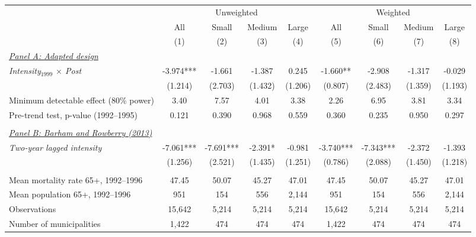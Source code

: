\begin{tabular}{lcccccccc} \hline \hline
 & \multicolumn{4}{c}{Unweighted} & \multicolumn{4}{c}{Weighted} \\ \cmidrule(lr){2-5} \cmidrule(lr){6-9}
 & All & Small & Medium & Large & All & Small & Medium & Large \\ 
 & (1) & (2) & (3) & (4) & (5) & (6) & (7) & (8) \\ \toprule
\underline{\textit{Panel A: Adapted design}} \\ 
\textit{Intensity$_{1999}$ $\times$ Post} & -3.974*** & -1.661 & -1.387 & 0.245 & -1.660** & -2.908 & -1.317 & -0.029 \\ 
 & (1.214) & (2.703) & (1.432) & (1.206) & (0.807) & (2.483) & (1.359) & (1.193) \\ 
Minimum detectable effect (80\% power) & 3.40 & 7.57 & 4.01 & 3.38 & 2.26 & 6.95 & 3.81 & 3.34 \\ 
Pre-trend test, p-value (1992--1995) & 0.121 & 0.390 & 0.968 & 0.559 & 0.360 & 0.235 & 0.950 & 0.297 \\ 
  & & & & & & & & \\ 
\underline{\textit{Panel B: Barham and Rowberry (2013)}} \\ 
\textit{Two-year lagged intensity} & -7.061*** & -7.691*** & -2.391* & -0.981 & -3.740*** & -7.343*** & -2.372 & -1.393 \\ 
 & (1.256) & (2.521) & (1.435) & (1.251) & (0.786) & (2.088) & (1.450) & (1.218) \\ 
  & & & & & & & & \\ 
Mean mortality rate 65+, 1992--1996 & 47.45 & 50.07 & 45.27 & 47.01 & 47.45 & 50.07 & 45.27 & 47.01 \\ 
Mean population 65+, 1992--1996 & 951 & 154 & 556 & 2,144 & 951 & 154 & 556 & 2,144 \\ 
Observations & 15,642 & 5,214 & 5,214 & 5,214 & 15,642 & 5,214 & 5,214 & 5,214 \\ 
Number of municipalities & 1,422 & 474 & 474 & 474 & 1,422 & 474 & 474 & 474 \\ 
\bottomrule
\end{tabular}